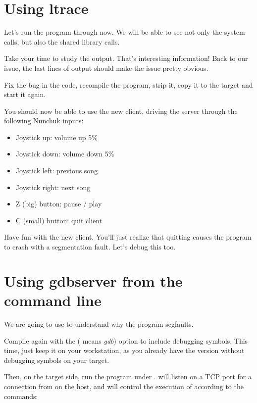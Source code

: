 \section{Using ltrace}

Let's run the program through  now. We will be able to see
not only the system calls, but also the shared library calls.

Take your time to study the  output. That's interesting
information! Back to our issue, the last lines of output should make the
issue pretty obvious.

Fix the bug in the code, recompile the program, strip it, copy it to
the target and start it again.

You should now be able to use the new client, driving the server
through the following Nunchuk inputs:

\begin{itemize}
   \item Joystick up: volume up 5\%
   \item Joystick down: volume down 5\%
   \item Joystick left: previous song
   \item Joystick right: next song
   \item Z (big) button: pause / play
   \item C (small) button: quit client
\end{itemize}

Have fun with the new client. You'll just realize that quitting
causes the program to crash with a segmentation fault. Let's debug this
too.

\section{Using gdbserver from the command line}

We are going to use  to understand why the program
segfaults.

Compile  again with the  (
means {\em gdb}) option to include debugging symbols. This time, just
keep it on your workstation, as you already have the version without
debugging symbols on your target.

Then, on the target side, run the program under .
 will listen on a TCP port for a connection from
 on the host, and will control the execution of
 according to the  commands:

